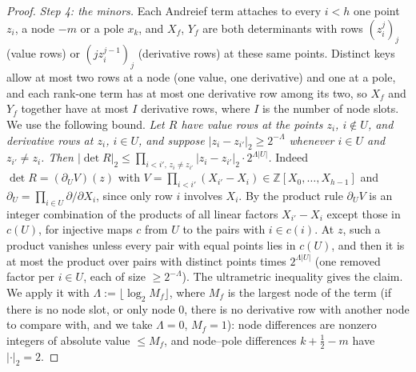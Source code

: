 \documentclass[11pt]{amsart}
\theoremstyle{definition}
\theoremstyle{remark}
\numberwithin{equation}{section}
\newcommand{\ZZ}{\mathbb{Z}}
\begin{document}
\begin{proof}
\emph{Step 4: the minors.} Each Andreief term attaches to every $i<h$ one point $z_i$, a node $-m$ or a pole $x_k$, and
$X_f$, $Y_f$ are both determinants with rows $(z_i^j)_j$ (value rows) or $(jz_i^{j-1})_j$ (derivative rows) at these same
points. Distinct keys allow at most two rows at a node (one value, one derivative) and one at a pole, and each rank-one
term has at most one derivative row among its two, so $X_f$ and $Y_f$ together have at most $I$ derivative rows, where
$I$ is the number of node slots. We use the following bound. \emph{Let $R$ have value rows at the points $z_i$, $i\notin U$,
and derivative rows at $z_i$, $i\in U$, and suppose $|z_i-z_{i'}|_2\ge2^{-\Lambda}$ whenever $i\in U$ and $z_{i'}\ne z_i$. Then
$|\det R|_2\le\prod_{i<i',\,z_i\ne z_{i'}}|z_i-z_{i'}|_2\cdot2^{\Lambda|U|}$.} Indeed $\det R=(\partial_UV)(z)$ with
$V=\prod_{i<i'}(X_{i'}-X_i)\in\ZZ[X_0,\dots,X_{h-1}]$ and $\partial_U=\prod_{i\in U}\partial/\partial X_i$, since only row $i$
involves $X_i$. By the product rule $\partial_UV$ is an integer combination of the products of all linear factors
$X_{i'}-X_i$ except those in $c(U)$, for injective maps $c$ from $U$ to the pairs with $i\in c(i)$. At $z$, such a product
vanishes unless every pair with equal points lies in $c(U)$, and then it is at most the product over pairs with distinct
points times $2^{\Lambda|U|}$ (one removed factor per $i\in U$, each of size $\ge2^{-\Lambda}$). The ultrametric inequality
gives the claim. We apply it with $\Lambda:=\lfloor\log_2M_f\rfloor$, where $M_f$ is the largest node of the term
(if there is no node slot, or only node $0$, there is no derivative row with another node to compare with, and we take
$\Lambda=0$, $M_f=1$): node
differences are nonzero integers of absolute value $\le M_f$, and node--pole differences $k+\frac12-m$ have $|\cdot|_2=2$.


\end{proof}
\end{document}
